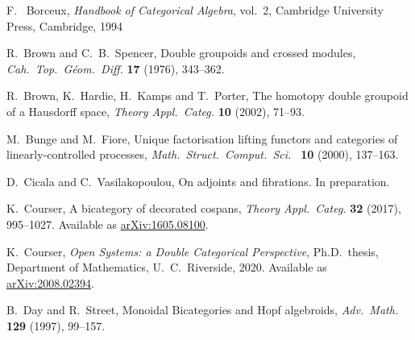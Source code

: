 \documentclass[reqno]{amsart}
\begin{document}
\begin{thebibliography}{100}
 F. \ Borceux, \textsl{Handbook of Categorical Algebra}, vol.\ 2, 
Cambridge University Press, Cambridge, 1994

 R.\ Brown and C.\ B.\ Spencer, Double groupoids and crossed modules, 
\textsl{Cah.\ Top.\ G\'eom.\ Diff.} \textbf{17} (1976), 343--362.

 R.\ Brown, K.\ Hardie, H.\ Kamps and T.\ Porter, The homotopy double groupoid of a Hausdorff space, \textsl{Theory Appl.\ Categ.} \textbf{10} (2002), 71--93.




 M.\ Bunge and M.\ Fiore, Unique factorisation lifting functors and categories of linearly-controlled processes, \textsl{Math.\ Struct.\ Comput.\ Sci.\ } \textbf{10} (2000), 137--163.


 D.\ Cicala and C.\ Vasilakopoulou, On adjoints and fibrations. In preparation.

 K.\ Courser, A bicategory of decorated cospans, \textsl{Theory Appl.\ Categ.} \textbf{32} (2017), 995--1027. Available as \href{https://arxiv.org/abs/1605.08100}{arXiv:1605.08100}.

 K.\ Courser, \textsl{Open Systems: a Double Categorical Perspective}, Ph.D.\ thesis, Department of Mathematics, U.\ C.\ Riverside, 2020.  Available as \href{https://arxiv.org/abs/2008.02394}{arXiv:2008.02394}.

 B.\ Day and R.\ Street, Monoidal Bicategories and Hopf algebroids, \textsl{Adv.\ Math.} \textbf{129} (1997), 99--157.



\end{thebibliography}
\end{document}

